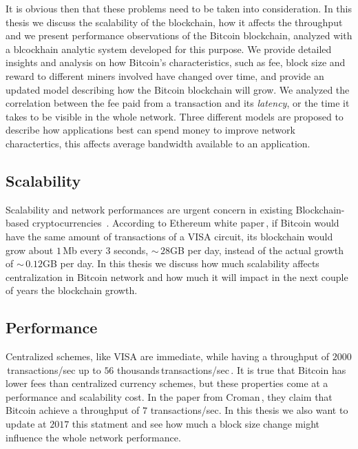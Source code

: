 \documentclass[USenglish]{uit-thesis}
\begin{document}
It is obvious then that these problems need to be taken
into consideration.
In this thesis we discuss the scalability of the blockchain, how it affects
the throughput and we present performance observations of the
Bitcoin blockchain, analyzed with a blcockhain analytic system developed
for this purpose. We provide detailed insights and analysis on how
Bitcoin's characteristics, such as fee, block size and reward to different
miners involved have changed over time, and provide an
updated model describing how the Bitcoin blockchain will grow. 
We analyzed the correlation between the fee paid from a transaction
and its \emph{latency}, or the time it takes to 
be visible in the whole network.
Three different models are proposed to describe how applications
best can spend money to improve network charactertics,
this affects average bandwidth available to an application. 

\subsection{Scalability}
\label{sec:prob_stat_scalability}
Scalability and network performances are urgent
concern in existing Blockchain-based
cryptocurrencies~\cite{croman2016}.
According to Ethereum white paper\,\cite{ethereum_white_paper},
if Bitcoin would have the same amount of transactions
of a VISA circuit, its blockchain would grow
about $1$\,Mb every $3$ seconds, $\sim$\,$28$GB per day,
instead of the actual growth of $\sim$\,$0.12$GB per day.
In this thesis we discuss how much scalability affects
centralization in Bitcoin network and how much it will
impact in the next couple of years the blockchain
growth.

\subsection{Performance}
Centralized schemes, like VISA are immediate, while having a
throughput of $2000$\,transactions/sec
up to $56$ thousands\,transactions/sec\,\cite{croman2016}.
It is true that Bitcoin has lower fees than centralized
currency schemes, but these properties
come at a performance and scalability cost.
In the paper from Croman\,\cite{croman2016}, they
claim that Bitcoin achieve a throughput of $7$ transactions/sec.
In this thesis we also want to update at $2017$ this statment
and see how much a block size change might
influence the whole network performance.
\end{document}
